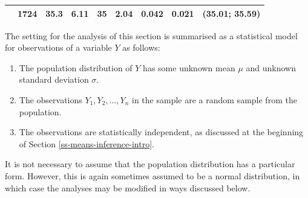 \documentclass[11pt,a4paper,openany]{book}
\begin{document}
\begin{longtable}[]{@{}lrrrrrrrc@{}}
\begin{minipage}[t]{0.30\columnwidth}
\end{minipage} & \begin{minipage}[t]{0.04\columnwidth}\raggedleft\strut
1724\strut
\end{minipage} & \begin{minipage}[t]{0.05\columnwidth}\raggedleft\strut
35.3\strut
\end{minipage} & \begin{minipage}[t]{0.03\columnwidth}\raggedleft\strut
6.11\strut
\end{minipage} & \begin{minipage}[t]{0.05\columnwidth}\raggedleft\strut
35\strut
\end{minipage} & \begin{minipage}[t]{0.03\columnwidth}\raggedleft\strut
2.04\strut
\end{minipage} & \begin{minipage}[t]{0.13\columnwidth}\raggedleft\strut
0.042\strut
\end{minipage} & \begin{minipage}[t]{0.08\columnwidth}\raggedleft\strut
0.021\strut
\end{minipage} & \begin{minipage}[t]{0.06\columnwidth}\centering\strut
(35.01; 35.59)\strut
\end{minipage}\tabularnewline
\bottomrule
\end{longtable}

The setting for the analysis of this section is summarised as a
statistical model for observations of a variable \(Y\) as follows:

\begin{enumerate}
\def\labelenumi{\arabic{enumi}.}
\item
  The population distribution of \(Y\) has some unknown mean \(\mu\) and
  unknown standard deviation \(\sigma\).
\item
  The observations \(Y_{1}, Y_{2}, \dots, Y_{n}\) in the sample are a
  random sample from the population.
\item
  The observations are statistically independent, as discussed at the
  beginning of Section \ref{ss-means-inference-intro}.
\end{enumerate}

It is not necessary to assume that the population distribution has a
particular form. However, this is again sometimes assumed to be a normal
distribution, in which case the analyses may be modified in ways
discussed below.
\end{document}
